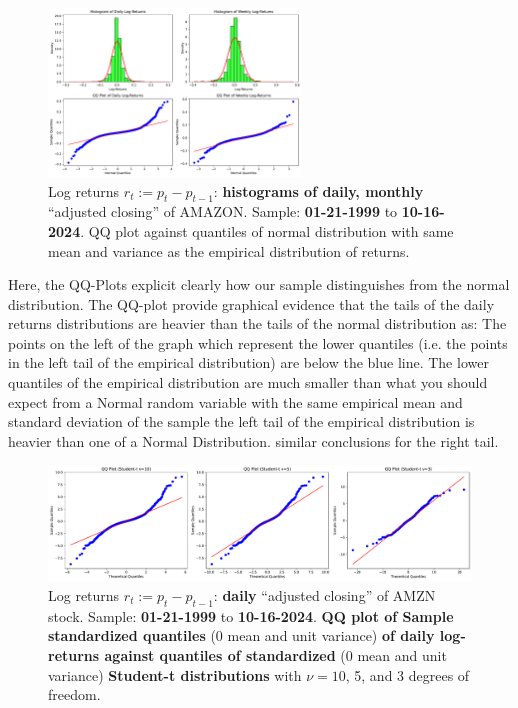 \documentclass{article}
\begin{document}
\begin{figure}[H]
    \centering
    \includegraphics[width=0.6\textwidth]{Img/QQplot_daily_weekly_AMZN.pdf}
    \caption{Log returns $r_t := p_t - p_{t-1}$: \textbf{histograms of daily, monthly} “adjusted closing” of AMAZON. 
    Sample: \textbf{01-21-1999} to \textbf{10-16-2024}. QQ plot against quantiles of normal distribution with same mean and variance as the empirical distribution of returns.}
    \label{fig:Hstogram_QQ_plot}
\end{figure}

\noindent Here, the QQ-Plots explicit clearly how our sample distinguishes from the normal distribution. 
The QQ-plot provide graphical evidence that the tails of the daily returns distributions are heavier than the tails of the normal distribution as: The points on the left of the graph which represent the lower quantiles (i.e. the points in the left tail of the empirical distribution) are below the blue line. The lower quantiles of the empirical distribution are much smaller than what you should expect from a Normal random variable with the same empirical mean and standard deviation of the sample the left tail of the empirical distribution is heavier than one of a Normal Distribution. similar conclusions for the right tail.
\begin{figure}[H]
    \centering
    \includegraphics[width=1\textwidth]{Img/qqplt_tstudents_AMZNdaily.pdf}
    \caption{Log returns $r_t := p_t - p_{t-1}$: \textbf{daily} “adjusted closing” of AMZN stock. 
    Sample: \textbf{01-21-1999} to \textbf{10-16-2024}. \textbf{QQ plot of Sample standardized quantiles} (0 mean and unit variance) \textbf{of daily log-returns against quantiles of standardized} (0 mean and unit variance) \textbf{Student-t distributions} with $\nu = 10$, 5, and 3 degrees of freedom.}
    \label{fig:Hstogram_QQ_plot_T_student}
\end{figure}
\end{document}
